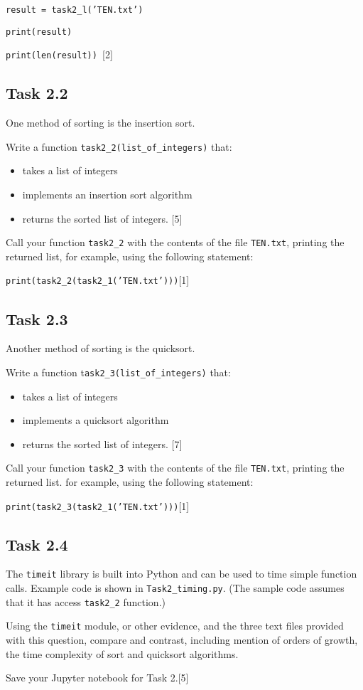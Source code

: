 \texttt{\qquad{}result = task2\_l('TEN.txt')}

\texttt{\qquad{}print(result)}

\texttt{\qquad{}print(len(result)) }\hfill{}{[}2{]} 

\subsection*{Task 2.2 }

One method of sorting is the insertion sort.

Write a function \texttt{task2\_2(list\_of\_integers)} that: 
\begin{itemize}
\item takes a list of integers 
\item implements an insertion sort algorithm 
\item returns the sorted list of integers. \hfill{}{[}5{]}
\end{itemize}
Call your function \texttt{task2\_2} with the contents of the file
\texttt{TEN.txt}, printing the returned list, for example, using the
following statement:

\texttt{\qquad{}print(task2\_2(task2\_1('TEN.txt')))}\hfill{}{[}1{]}

\subsection*{Task 2.3 }

Another method of sorting is the quicksort. 

Write a function t\texttt{ask2\_3(list\_of\_integers)} that: 
\begin{itemize}
\item takes a list of integers 
\item implements a quicksort algorithm 
\item returns the sorted list of integers.\hfill{} {[}7{]}
\end{itemize}
Call your function \texttt{task2\_3} with the contents of the file
\texttt{TEN.txt}, printing the returned list. for example, using the
following statement: 

\texttt{\qquad{}print(task2\_3(task2\_1('TEN.txt')))}\hfill{}{[}1{]} 

\subsection*{Task 2.4 }

The \texttt{timeit} library is built into Python and can be used to
time simple function calls. Example code is shown in \texttt{Task2\_timing.py}.
(The sample code assumes that it has access \texttt{task2\_2} function.) 

Using the \texttt{timeit} module, or other evidence, and the three
text files provided with this question, compare and contrast, including
mention of orders of growth, the time complexity of sort and quicksort
algorithms. 

Save your Jupyter notebook for Task 2.\hfill{}{[}5{]}
